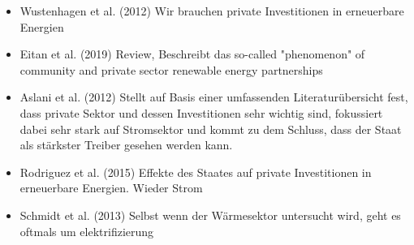 \begin{itemize}
	\item Wustenhagen et al. (2012) \cite{wustenhagen2012strategic} Wir brauchen private Investitionen in erneuerbare Energien
	\item Eitan et al. (2019) \cite{eitan2019community} Review,  Beschreibt das so-called "phenomenon" of community and private sector renewable energy partnerships
	\item Aslani et al. (2012) \cite{aslani2012prime} Stellt auf Basis einer umfassenden Literaturübersicht fest, dass private Sektor und dessen Investitionen sehr wichtig sind, fokussiert dabei sehr stark auf Stromsektor und kommt zu dem Schluss, dass der Staat als stärkster Treiber gesehen werden kann.
	\item Rodriguez et al. (2015) \cite{rodriguez2015renewable} Effekte des Staates auf private Investitionen in erneuerbare Energien. Wieder Strom
	\item Schmidt et al. (2013) \cite{schmidt2013attracting} Selbst wenn der Wärmesektor untersucht wird, geht es oftmals um elektrifizierung

\end{itemize}
